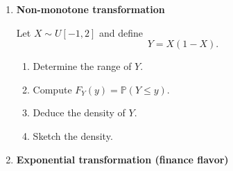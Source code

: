 \documentclass[11pt]{article}
\begin{document}
\begin{enumerate}[leftmargin=*, itemsep=1.2em]
\begin{enumerate}[label=(\alph*)]
\medskip

\item \textbf{Link between smoothness of $\varphi_X$ and moments (optional but instructive).}
\begin{enumerate}[label=(\roman*)]
\item Compute $\varphi_X'(t)$ and check whether $\varphi_X'(0)$ exists.
Recall that if $\mathbb{E}[|X|]<\infty$, then $\varphi_X'(0)=i\mathbb{E}[X]$.
\item Compute $\varphi_X''(0)$ and discuss what it suggests about $\mathbb{E}[X^2]$.
(Recall: if $\mathbb{E}[X^2]<\infty$ then $\varphi_X''(0)=-\mathbb{E}[X^2]$.)
\end{enumerate}

\medskip

\item \textbf{Comparison with the Gaussian case.}
Let $Z\sim\mathcal{N}(0,\sigma^2)$ so that
\[
\varphi_Z(t)=\exp\!\left(-\frac{\sigma^2 t^2}{2}\right).
\]
\begin{enumerate}[label=(\roman*)]
\item Compare the decay rates of $\varphi_X(t)=1/(1+t^2)$ and $\varphi_Z(t)$ as $|t|\to\infty$.
\item Explain qualitatively what this implies about the tails of $X$ versus $Z$.
\item Which variable has heavier tails? Give one quantitative argument (e.g.\ compare $\mathbb{P}(|X|>x)$ and $\mathbb{P}(|Z|>x)$ asymptotically).
\end{enumerate}

\end{enumerate}
\bigskip
\item \textbf{Non-monotone transformation}

Let $X\sim U[-1,2]$ and define
\[
Y = X(1-X).
\]

\begin{enumerate}[label=(\alph*)]
\item Determine the range of $Y$.
\item Compute $F_Y(y)=\mathbb{P}(Y\le y)$.
\item Deduce the density of $Y$.
\item Sketch the density.
\end{enumerate}

\bigskip

\item \textbf{Exponential transformation (finance flavor)}


\end{enumerate}
\end{document}
